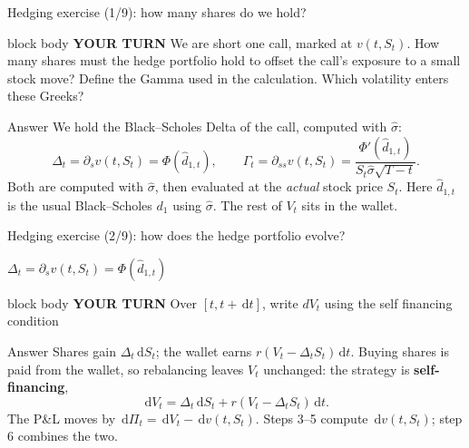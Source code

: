 \documentclass[handout,10pt,aspectratio=169]{beamer}
\newenvironment{pausebox}{\begin{beamercolorbox}[rounded=true,sep=0.8em,wd=\textwidth]{block body}
  \textbf{\color{CourseGold}YOUR TURN}\quad}{\end{beamercolorbox}}
\newcommand{\dd}{\,\mathrm d}
\newcommand{\1}{\mathbf 1}
\newcommand{\Ncdf}{\Phi}
\newcommand{\greekrecall}[1]{\par{\small\color{CourseBlue}\(\displaystyle #1\)\par}}
\begin{document}
\begin{frame}{Hedging exercise (1/9): how many shares do we hold?}
\begin{pausebox}
We are short one call, marked at \(v(t,S_t)\). How many shares must the hedge
portfolio hold to offset the call's exposure to a small stock move?
Define the Gamma used in the calculation. Which volatility enters these Greeks?
\end{pausebox}

\begin{exampleblock}{Answer}
We hold the Black--Scholes Delta of the call, computed with \(\widehat\sigma\):
\[
\boxed{\Delta_t=\partial_s v(t,S_t)=\Ncdf(\widehat d_{1,t}),}
\qquad
\Gamma_t=\partial_{ss}v(t,S_t)=\frac{\Ncdf'(\widehat d_{1,t})}{S_t\widehat\sigma\sqrt{T-t}}.
\]
Both are computed with \(\widehat\sigma\), then evaluated at the
\emph{actual} stock price \(S_t\). Here \(\widehat d_{1,t}\) is the usual
Black--Scholes \(d_1\) using \(\widehat\sigma\). The rest of \(V_t\) sits in
the wallet.
\end{exampleblock}
\end{frame}

\begin{frame}{Hedging exercise (2/9): how does the hedge portfolio evolve?}
\greekrecall{\Delta_t=\partial_s v(t,S_t)=\Ncdf(\widehat d_{1,t})}
\begin{pausebox}
Over \([t,t+\dd t]\), write $dV_t$ using the self financing condition
\end{pausebox}

\begin{exampleblock}{Answer}
Shares gain \(\Delta_t\dd S_t\); the wallet earns \(r(V_t-\Delta_tS_t)\dd t\).
Buying shares is paid from the wallet, so rebalancing leaves \(V_t\)
unchanged: the strategy is \textbf{self-financing},
\[
\boxed{\dd V_t=\Delta_t\dd S_t+r(V_t-\Delta_tS_t)\dd t.}
\]
The P\&L moves by \(\dd\Pi_t=\dd V_t-\dd v(t,S_t)\). Steps 3--5 compute
\(\dd v(t,S_t)\); step 6 combines the two.
\end{exampleblock}
\end{frame}
\end{document}
